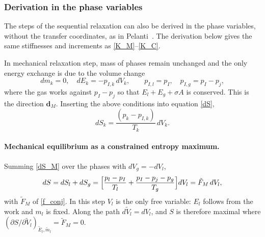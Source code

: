 \subsubsection{Derivation in the phase variables}\label{sec_phase}
The steps of the sequential relaxation can also be derived in the phase variables, without the transfer coordinates, as in Pelanti~\cite{Pelanti2022}. The derivation below gives the same stiffnesses and increments as \eqref{K_M}--\eqref{K_C}.

In mechanical relaxation step, mass of phases remain unchanged and the only energy exchange is due to the volume change
\begin{equation}\label{work_M}
dm_k=0, \quad dE_k=-p_{I,k}\,dV_k,\qquad p_{I,l}=p_I,\quad p_{I,g}=p_I-p_{j},
\end{equation}
where the gas works against $p_I-p_{j}$ so that $E_l+E_g+\sigma A$ is conserved. This is the direction $\boldsymbol{d}_M$. Inserting the above conditions into equation \eqref{dS},
\begin{equation}\label{dS_M}
dS_k=\frac{(p_k-p_{I,k})}{T_k}\,dV_k.
\end{equation}
\paragraph{Mechanical equilibrium as a constrained entropy maximum.}
Summing \eqref{dS_M} over the phases with $dV_g=-dV_l$,
\begin{equation}\label{dS_M_sum}
dS=dS_l+dS_g=\Bigl[\frac{p_l-p_I}{T_l}+\frac{p_I-p_{j}-p_g}{T_g}\Bigr]dV_l=\tilde{F}_M\,dV_l,
\end{equation}
with $\tilde{F}_M$ of \eqref{f_conj}. In this step $V_l$ is the only free variable: $E_l$ follows from the work and $m_l$ is fixed. Along the path $d\tilde{V}_l=dV_l$, and $S$ is therefore maximal where $(\partial S/\partial\tilde{V}_l)_{\tilde{E}_l,\tilde{m}_l}=\tilde{F}_M=0$.

